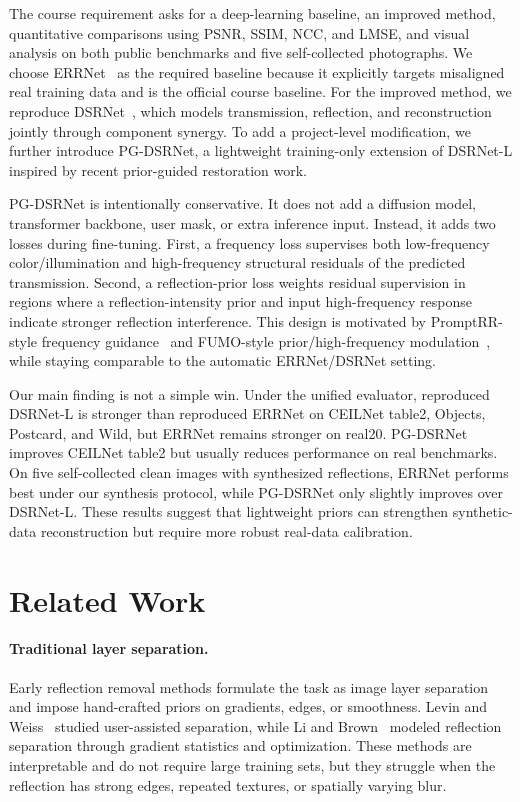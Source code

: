 \documentclass[10pt,twocolumn,letterpaper]{article}
\newcommand{\method}{PG-DSRNet\xspace}
\begin{document}
The course requirement asks for a deep-learning baseline, an improved method, quantitative comparisons using PSNR, SSIM, NCC, and LMSE, and visual analysis on both public benchmarks and five self-collected photographs.
We choose ERRNet~\cite{wei2019errnet} as the required baseline because it explicitly targets misaligned real training data and is the official course baseline.
For the improved method, we reproduce DSRNet~\cite{hu2023dsrnet}, which models transmission, reflection, and reconstruction jointly through component synergy.
To add a project-level modification, we further introduce \method, a lightweight training-only extension of DSRNet-L inspired by recent prior-guided restoration work.

\method is intentionally conservative.
It does not add a diffusion model, transformer backbone, user mask, or extra inference input.
Instead, it adds two losses during fine-tuning.
First, a frequency loss supervises both low-frequency color/illumination and high-frequency structural residuals of the predicted transmission.
Second, a reflection-prior loss weights residual supervision in regions where a reflection-intensity prior and input high-frequency response indicate stronger reflection interference.
This design is motivated by PromptRR-style frequency guidance~\cite{wang2024promptrr} and FUMO-style prior/high-frequency modulation~\cite{desmon2024fumo}, while staying comparable to the automatic ERRNet/DSRNet setting.

Our main finding is not a simple win.
Under the unified evaluator, reproduced DSRNet-L is stronger than reproduced ERRNet on CEILNet table2, Objects, Postcard, and Wild, but ERRNet remains stronger on real20.
\method improves CEILNet table2 but usually reduces performance on real benchmarks.
On five self-collected clean images with synthesized reflections, ERRNet performs best under our synthesis protocol, while \method only slightly improves over DSRNet-L.
These results suggest that lightweight priors can strengthen synthetic-data reconstruction but require more robust real-data calibration.

\section{Related Work}

\paragraph{Traditional layer separation.}
Early reflection removal methods formulate the task as image layer separation and impose hand-crafted priors on gradients, edges, or smoothness.
Levin and Weiss~\cite{levin2007user} studied user-assisted separation, while Li and Brown~\cite{li2014single} modeled reflection separation through gradient statistics and optimization.
These methods are interpretable and do not require large training sets, but they struggle when the reflection has strong edges, repeated textures, or spatially varying blur.
\end{document}
